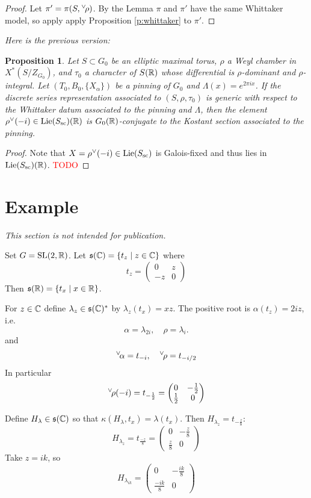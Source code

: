 \documentclass{article}
\newtheorem{pro}[thm]{Proposition}
\theoremstyle{definition}
\numberwithin{equation}{section}
\renewcommand{\-}{\hyp{}}
\newcommand{\s}{\mathfrak s}
\newcommand{\SL}{\mathrm{SL}}
\newcommand{\ch}[1]{\negthinspace\negthinspace\negthinspace\phantom{a}^\vee\negthinspace #1}
\begin{document}
\begin{proof}
Let $\pi'=\pi(S,\ch\rho)$. By the Lemma $\pi$ and $\pi'$ have the same Whittaker model, so apply 
apply Proposition \ref{p:whittaker} to $\pi'$.
\end{proof}


{\it Here is the previous version:}

\begin{pro} \label{pro:gen}
Let $S \subset G_0$ be an elliptic maximal torus, $\rho$ a Weyl chamber in $X^*(S/Z_{G_0})$, and $\tau_0$ a character of $S(\mathbb{R})$ whose differential is $\rho$-dominant and $\rho$-integral. Let $(T_0,B_0,\{X_\alpha\})$ be a pinning of $G_0$ and $\Lambda(x)=e^{2\pi ix}$. If the discrete series representation associated to $(S,\rho,\tau_0)$ is generic with respect to the Whittaker datum associated to the pinning and $\Lambda$, then the element $\rho^\vee(-i) \in \textrm{Lie}(S_{\textrm{sc}})(\mathbb{R})$ is $G_0(\mathbb{R})$-conjugate to the Kostant section associated to the pinning.
\end{pro}
\begin{proof}
Note that $X=\rho^\vee(-i) \in \textrm{Lie}(S_{\textrm{sc}})$ is Galois-fixed and thus lies in $\textrm{Lie}(S_{\textrm{sc}})(\mathbb{R})$.
\textcolor{red}{TODO}
\end{proof}

\section{Example}

{\it This section is not intended for publication.}

Set $G=\SL(2,\R)$. Let $\s(\C)=\{t_z\mid z\in\C\}$ where
$$
t_z=\begin{pmatrix}0&z\\-z&0
\end{pmatrix}
$$
Then $\s(\R)=\{t_x\mid x\in\R\}$.

For $z\in \mathbb{C}$ define $\lambda_z\in \s(\C)^*$ by $\lambda_z(t_x)=xz$.
The positive root is  $\alpha(t_z)=2iz$, i.e.
$$
\alpha=\lambda_{2i},\quad \rho=\lambda_i.
$$
and
$$
\ch\alpha=t_{-i}, \quad \ch\rho=t_{-i/2}
$$
In particular
$$
\ch\rho(-i)=t_{-\frac 12}=\begin{pmatrix}0&-\frac 12\\\frac 12&0
\end{pmatrix}
$$

Define $H_{\lambda}\in \s(\C)$ so that $\kappa(H_\lambda,t_x)=\lambda(t_x)$. Then $H_{\lambda_z}=t_{-\frac z8}$:
$$
H_{\lambda_z}=t_{\frac{-z}8}=
\begin{pmatrix}0&-\frac{z}8\\\frac{z}8&0
\end{pmatrix}
$$
Take $z=ik$, so
$$
H_{\lambda_{ik}}=
\begin{pmatrix}0&-\frac{ik}8\\\frac{-ik}8&0
\end{pmatrix}
$$
\end{document}
